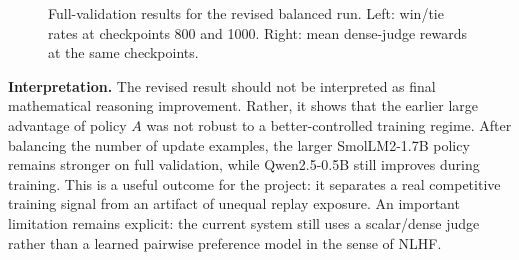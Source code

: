 \documentclass[10pt,a4paper]{article}
\newcommand{\newAWinEightHundred}{0.324}
\newcommand{\newBWinEightHundred}{0.517}
\newcommand{\newTieEightHundred}{0.159}
\newcommand{\newARewardEightHundred}{0.1429}
\newcommand{\newBRewardEightHundred}{0.1714}
\newcommand{\newAWinThousand}{0.340}
\newcommand{\newBWinThousand}{0.516}
\newcommand{\newTieThousand}{0.143}
\newcommand{\newARewardThousand}{0.1429}
\newcommand{\newBRewardThousand}{0.1721}
\begin{document}
\begin{figure}[H]
\centering
\begin{minipage}[t]{0.48\linewidth}
\centering
{}
\end{minipage}\hfill
\begin{minipage}[t]{0.48\linewidth}
\centering
{}
\end{minipage}
\caption{Full-validation results for the revised balanced run. Left: win/tie rates at checkpoints 800 and 1000. Right: mean dense-judge rewards at the same checkpoints.}
\label{fig:new-results}
\end{figure}

\textbf{Interpretation.}
The revised result should not be interpreted as final mathematical reasoning improvement. Rather, it shows that the earlier large advantage of policy $A$ was not robust to a better-controlled training regime. After balancing the number of update examples, the larger SmolLM2-1.7B policy remains stronger on full validation, while Qwen2.5-0.5B still improves during training. This is a useful outcome for the project: it separates a real competitive training signal from an artifact of unequal replay exposure. An important limitation remains explicit: the current system still uses a scalar/dense judge rather than a learned pairwise preference model in the sense of NLHF.
\end{document}

